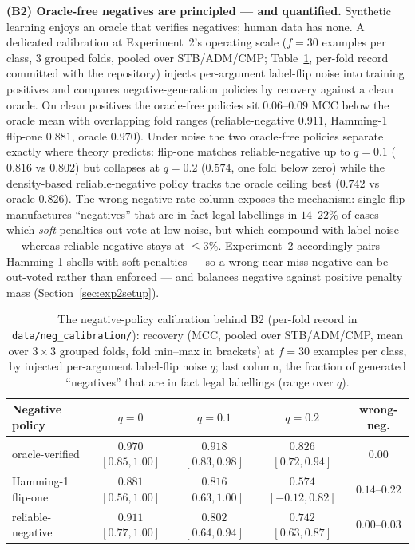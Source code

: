 \documentclass[review,12pt]{elsarticle}
\theoremstyle{definition}
\theoremstyle{remark}
\begin{document}
\textbf{(B2) Oracle-free negatives are principled --- and quantified.}
Synthetic learning enjoys an oracle that verifies negatives; human data has
none. A dedicated calibration at Experiment~2's operating scale ($f{=}30$
examples per class, $3$ grouped folds, pooled over STB/ADM/CMP;
Table~\ref{tab:negcal}, per-fold record committed with the repository)
injects per-argument label-flip noise into training positives and compares
negative-generation policies by recovery against a clean oracle. On clean
positives the oracle-free policies sit $0.06$--$0.09$ MCC below the oracle
mean with overlapping fold ranges (reliable-negative $0.911$, Hamming-1
flip-one $0.881$, oracle $0.970$). Under noise the two oracle-free policies
separate exactly where theory predicts: flip-one matches reliable-negative up
to $q{=}0.1$ ($0.816$ vs $0.802$) but collapses at $q{=}0.2$ ($0.574$, one
fold below zero) while the density-based reliable-negative policy tracks the
oracle ceiling best ($0.742$ vs oracle $0.826$). The wrong-negative-rate
column exposes the mechanism: single-flip manufactures ``negatives'' that are
in fact legal labellings in $14$--$22\%$ of cases --- which \emph{soft}
penalties out-vote at low noise, but which compound with label noise ---
whereas reliable-negative stays at $\le3\%$. Experiment~2 accordingly pairs
Hamming-1 shells with soft penalties --- so a wrong near-miss negative can be
out-voted rather than enforced --- and balances negative against positive
penalty mass (Section~\ref{sec:exp2setup}).

\begin{table}[t]
\centering
\small
\caption{The negative-policy calibration behind B2 (per-fold record in
\texttt{data/neg\_calibration/}): recovery (MCC, pooled over STB/ADM/CMP,
mean over $3{\times}3$ grouped folds, fold min--max in brackets) at $f{=}30$
examples per class, by injected per-argument label-flip noise $q$; last
column, the fraction of generated ``negatives'' that are in fact legal
labellings (range over $q$).}
\label{tab:negcal}
\begin{tabular}{lcccc}
\toprule
Negative policy & $q{=}0$ & $q{=}0.1$ & $q{=}0.2$ & wrong-neg.\\
\midrule
oracle-verified & $0.970$ {\scriptsize$[0.85,1.00]$} & $0.918$ {\scriptsize$[0.83,0.98]$} & $0.826$ {\scriptsize$[0.72,0.94]$} & $0.00$\\
Hamming-1 flip-one & $0.881$ {\scriptsize$[0.56,1.00]$} & $0.816$ {\scriptsize$[0.63,1.00]$} & $0.574$ {\scriptsize$[-0.12,0.82]$} & $0.14$--$0.22$\\
reliable-negative & $0.911$ {\scriptsize$[0.77,1.00]$} & $0.802$ {\scriptsize$[0.64,0.94]$} & $0.742$ {\scriptsize$[0.63,0.87]$} & $0.00$--$0.03$\\
\bottomrule
\end{tabular}
\end{table}
\end{document}
